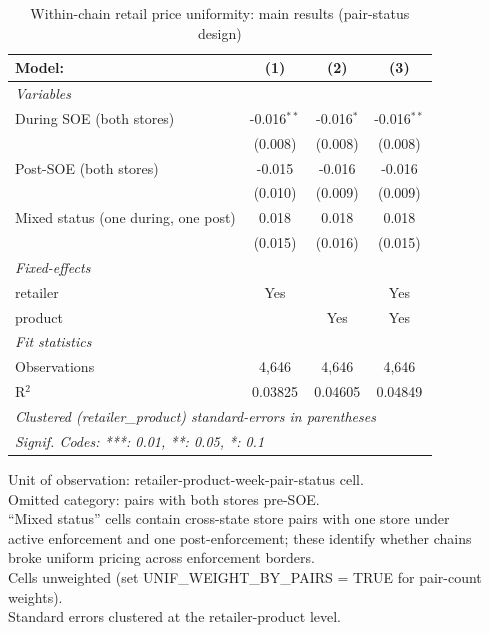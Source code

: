 
\begin{table}[htbp]
   \caption{\label{tab:uniformity_retail_main} Within-chain retail price uniformity: main results (pair-status design)}
   \centering
   \begin{tabular}{lccc}
      \tabularnewline \midrule \midrule
      Model:                              & (1)           & (2)          & (3)\\  
      \midrule
      \emph{Variables}\\
      During SOE (both stores)            & -0.016$^{**}$ & -0.016$^{*}$ & -0.016$^{**}$\\   
                                          & (0.008)       & (0.008)      & (0.008)\\   
      Post-SOE (both stores)              & -0.015        & -0.016       & -0.016\\   
                                          & (0.010)       & (0.009)      & (0.009)\\   
      Mixed status (one during, one post) & 0.018         & 0.018        & 0.018\\   
                                          & (0.015)       & (0.016)      & (0.015)\\   
      \midrule
      \emph{Fixed-effects}\\
      retailer                            & Yes           &              & Yes\\  
      product                             &               & Yes          & Yes\\  
      \midrule
      \emph{Fit statistics}\\
      Observations                        & 4,646         & 4,646        & 4,646\\  
      R$^2$                               & 0.03825       & 0.04605      & 0.04849\\  
      \midrule \midrule
      \multicolumn{4}{l}{\emph{Clustered (retailer\_product) standard-errors in parentheses}}\\
      \multicolumn{4}{l}{\emph{Signif. Codes: ***: 0.01, **: 0.05, *: 0.1}}\\
   \end{tabular}
   
   \par \raggedright 
   Unit of observation: retailer-product-week-pair-status cell.\\
   Omitted category: pairs with both stores pre-SOE.\\
   ``Mixed status'' cells contain cross-state store pairs with one store under\\
   active enforcement and one post-enforcement; these identify whether chains\\
   broke uniform pricing across enforcement borders.\\
   Cells unweighted (set UNIF\_WEIGHT\_BY\_PAIRS = TRUE for pair-count weights).\\
   Standard errors clustered at the retailer-product level.
\end{table}


